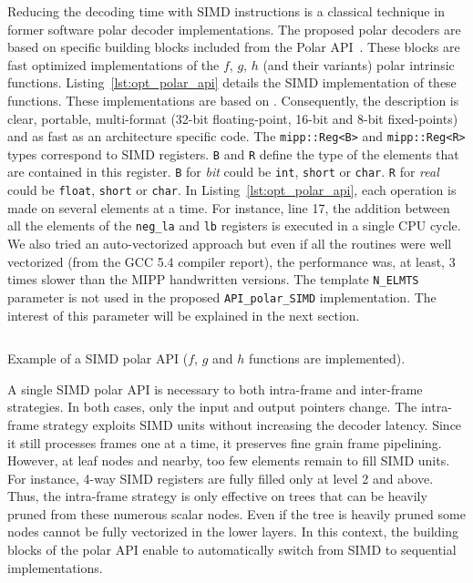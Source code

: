 Reducing the decoding time with SIMD instructions is a classical technique in
former software polar decoder implementations. The proposed polar decoders are
based on specific building blocks included from the Polar
API~\cite{Cassagne2015c,Cassagne2016b}. These blocks are fast optimized
implementations of the $f$, $g$, $h$ (and their variants) polar intrinsic
functions. Listing~\ref{lst:opt_polar_api} details the SIMD implementation of
these functions. These implementations are based on \MIPP. Consequently, the
description is clear, portable, multi-format (32-bit floating-point, 16-bit and
8-bit fixed-points) and as fast as an architecture specific code. The
\verb|mipp::Reg<B>| and \verb|mipp::Reg<R>| types correspond to SIMD registers.
\verb|B| and \verb|R| define the type of the elements that are contained in this
register. \verb|B| for \textit{bit} could be \verb|int|, \verb|short| or
\verb|char|. \verb|R| for \textit{real} could be \verb|float|, \verb|short| or
\verb|char|. In Listing~\ref{lst:opt_polar_api}, each operation is made on
several elements at a time. For instance, line 17, the addition between all the
elements of the \verb|neg_la| and \verb|lb| registers is executed in a single
CPU cycle. We also tried an auto-vectorized approach but even if all the
routines were well vectorized (from the GCC 5.4 compiler report), the
performance was, at least, 3 times slower than the MIPP handwritten versions.
The template \verb|N_ELMTS| parameter is not used in the proposed
\verb|API_polar_SIMD| implementation. The interest of this parameter will be
explained in the next section.

\begin{listing}%
  \inputminted[frame=lines,linenos]{C++}{\curChapter/src/polar/f_g_h_simd.cpp}
  \caption{Example of a \Cxx SIMD polar API ($f$, $g$ and $h$ functions are
    implemented).}
  \label{lst:opt_polar_api}
\end{listing}

A single SIMD polar API is necessary to both intra-frame and inter-frame
strategies. In both cases, only the input and output pointers change. The
intra-frame strategy exploits SIMD units without increasing the decoder latency.
Since it still processes frames one at a time, it preserves fine grain
frame pipelining. However, at leaf nodes and nearby, too few elements remain to
fill SIMD units. For instance, 4-way SIMD registers are fully filled only at
level 2 and above. Thus, the intra-frame strategy is only effective on trees
that can be heavily pruned from these numerous scalar nodes. Even if the tree is
heavily pruned some nodes cannot be fully vectorized in the lower layers. In
this context, the building blocks of the polar API enable to automatically
switch from SIMD to sequential implementations.

